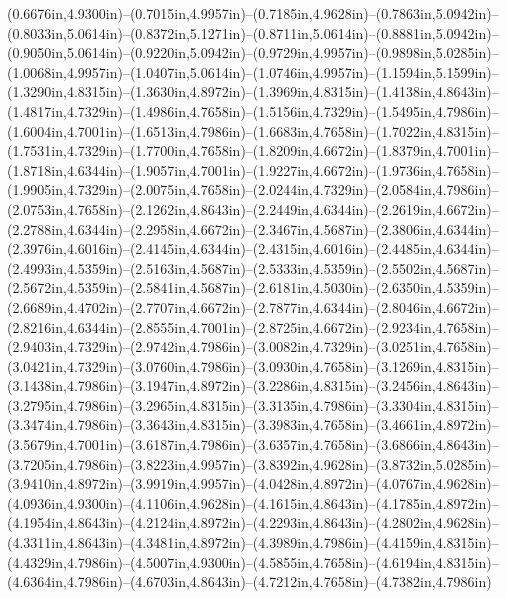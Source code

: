 (0.6676in,4.9300in)--(0.7015in,4.9957in)--(0.7185in,4.9628in)--(0.7863in,5.0942in)--(0.8033in,5.0614in)--(0.8372in,5.1271in)--(0.8711in,5.0614in)--(0.8881in,5.0942in)--(0.9050in,5.0614in)--(0.9220in,5.0942in)--(0.9729in,4.9957in)--(0.9898in,5.0285in)--(1.0068in,4.9957in)--(1.0407in,5.0614in)--(1.0746in,4.9957in)--(1.1594in,5.1599in)--(1.3290in,4.8315in)--(1.3630in,4.8972in)--(1.3969in,4.8315in)--(1.4138in,4.8643in)--(1.4817in,4.7329in)--(1.4986in,4.7658in)--(1.5156in,4.7329in)--(1.5495in,4.7986in)--(1.6004in,4.7001in)--(1.6513in,4.7986in)--(1.6683in,4.7658in)--(1.7022in,4.8315in)--(1.7531in,4.7329in)--(1.7700in,4.7658in)--(1.8209in,4.6672in)--(1.8379in,4.7001in)--(1.8718in,4.6344in)--(1.9057in,4.7001in)--(1.9227in,4.6672in)--(1.9736in,4.7658in)--(1.9905in,4.7329in)--(2.0075in,4.7658in)--(2.0244in,4.7329in)--(2.0584in,4.7986in)--(2.0753in,4.7658in)--(2.1262in,4.8643in)--(2.2449in,4.6344in)--(2.2619in,4.6672in)--(2.2788in,4.6344in)--(2.2958in,4.6672in)--(2.3467in,4.5687in)--(2.3806in,4.6344in)--(2.3976in,4.6016in)--(2.4145in,4.6344in)--(2.4315in,4.6016in)--(2.4485in,4.6344in)--(2.4993in,4.5359in)--(2.5163in,4.5687in)--(2.5333in,4.5359in)--(2.5502in,4.5687in)--(2.5672in,4.5359in)--(2.5841in,4.5687in)--(2.6181in,4.5030in)--(2.6350in,4.5359in)--(2.6689in,4.4702in)--(2.7707in,4.6672in)--(2.7877in,4.6344in)--(2.8046in,4.6672in)--(2.8216in,4.6344in)--(2.8555in,4.7001in)--(2.8725in,4.6672in)--(2.9234in,4.7658in)--(2.9403in,4.7329in)--(2.9742in,4.7986in)--(3.0082in,4.7329in)--(3.0251in,4.7658in)--(3.0421in,4.7329in)--(3.0760in,4.7986in)--(3.0930in,4.7658in)--(3.1269in,4.8315in)--(3.1438in,4.7986in)--(3.1947in,4.8972in)--(3.2286in,4.8315in)--(3.2456in,4.8643in)--(3.2795in,4.7986in)--(3.2965in,4.8315in)--(3.3135in,4.7986in)--(3.3304in,4.8315in)--(3.3474in,4.7986in)--(3.3643in,4.8315in)--(3.3983in,4.7658in)--(3.4661in,4.8972in)--(3.5679in,4.7001in)--(3.6187in,4.7986in)--(3.6357in,4.7658in)--(3.6866in,4.8643in)--(3.7205in,4.7986in)--(3.8223in,4.9957in)--(3.8392in,4.9628in)--(3.8732in,5.0285in)--(3.9410in,4.8972in)--(3.9919in,4.9957in)--(4.0428in,4.8972in)--(4.0767in,4.9628in)--(4.0936in,4.9300in)--(4.1106in,4.9628in)--(4.1615in,4.8643in)--(4.1785in,4.8972in)--(4.1954in,4.8643in)--(4.2124in,4.8972in)--(4.2293in,4.8643in)--(4.2802in,4.9628in)--(4.3311in,4.8643in)--(4.3481in,4.8972in)--(4.3989in,4.7986in)--(4.4159in,4.8315in)--(4.4329in,4.7986in)--(4.5007in,4.9300in)--(4.5855in,4.7658in)--(4.6194in,4.8315in)--(4.6364in,4.7986in)--(4.6703in,4.8643in)--(4.7212in,4.7658in)--(4.7382in,4.7986in)
